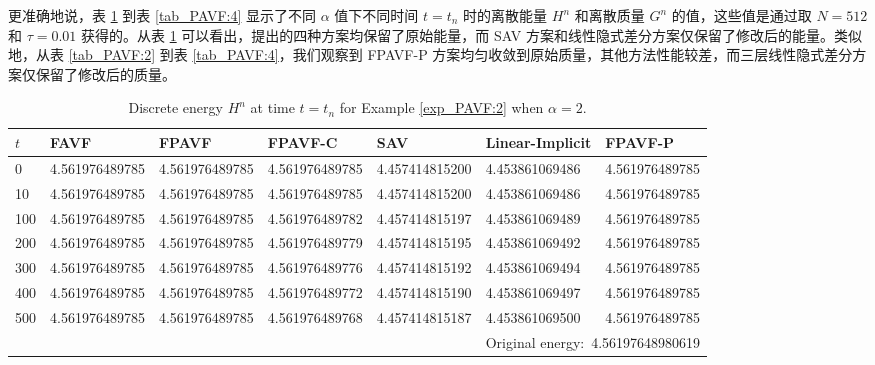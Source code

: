 	更准确地说，表 \ref{tab_PAVF:1} 到表 \ref{tab_PAVF:4} 显示了不同 $\alpha$ 值下不同时间 $t=t_n$ 时的离散能量 $H^n$ 和离散质量 $G^n$ 的值，这些值是通过取 $N=512$ 和 $\tau=0.01$ 获得的。从表 \ref{tab_PAVF:1} 可以看出，提出的四种方案均保留了原始能量，而 SAV 方案和线性隐式差分方案仅保留了修改后的能量。类似地，从表 \ref{tab_PAVF:2} 到表 \ref{tab_PAVF:4}，我们观察到 FPAVF-P 方案均匀收敛到原始质量，其他方法性能较差，而三层线性隐式差分方案仅保留了修改后的质量。

	
\begin{table}[H]\small
	\centering
	\caption{Discrete energy $H^n$ at time $t=t_n$ for Example \ref{exp_PAVF:2} when $\alpha=2$.}
	  \begin{tabular}{lllllll}
	  \toprule
       $t$   &FAVF   &FPAVF   &FPAVF-C   &SAV    &Linear-Implicit   &FPAVF-P\\
	  \midrule
	  0     &4.561976489785   &4.561976489785   &4.561976489785   &4.457414815200   &4.453861069486   &4.561976489785 \\
	  10    &4.561976489785   &4.561976489785   &4.561976489785   &4.457414815200   &4.453861069486   &4.561976489785 \\
	  100   &4.561976489785   &4.561976489785   &4.561976489782   &4.457414815197   &4.453861069489   &4.561976489785 \\
	  200   &4.561976489785   &4.561976489785   &4.561976489779   &4.457414815195   &4.453861069492   &4.561976489785 \\
	  300   &4.561976489785   &4.561976489785   &4.561976489776   &4.457414815192   &4.453861069494   &4.561976489785 \\
	  400   &4.561976489785   &4.561976489785   &4.561976489772   &4.457414815190   &4.453861069497   &4.561976489785 \\
	  500   &4.561976489785   &4.561976489785   &4.561976489768   &4.457414815187   &4.453861069500   &4.561976489785 \\
	  \midrule
	  \multicolumn{7}{r}{Original energy:~4.56197648980619} \\
	  \bottomrule
	  \end{tabular}\label{tab_PAVF:1}%
  \end{table}%


